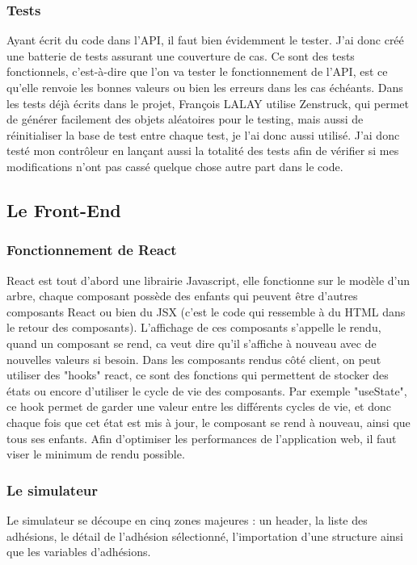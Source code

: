 \documentclass[a4paper,12pt]{report}
\begin{document}
\subsubsection{Tests}
Ayant écrit du code dans l'API, il faut bien évidemment le tester. J'ai donc créé une batterie de tests assurant une couverture de cas. Ce sont des tests fonctionnels, c'est-à-dire que l'on va tester le fonctionnement de l'API, est ce qu'elle renvoie les bonnes valeurs ou bien les erreurs dans les cas échéants. Dans les tests déjà écrits dans le projet, François LALAY utilise Zenstruck, qui permet de générer facilement des objets aléatoires pour le testing, mais aussi de réinitialiser la base de test entre chaque test, je l'ai donc aussi utilisé. J'ai donc testé mon contrôleur en lançant aussi la totalité des tests afin de vérifier si mes modifications n'ont pas cassé quelque chose autre part dans le code.

\subsection{Le Front-End}

\subsubsection{Fonctionnement de React}
React est tout d'abord une librairie Javascript, elle fonctionne sur le modèle d'un arbre, chaque composant possède des enfants qui peuvent être d'autres composants React ou bien du JSX (c'est le code qui ressemble à du HTML dans le retour des composants). L'affichage de ces composants s'appelle le rendu, quand un composant se rend, ca veut dire qu'il s'affiche à nouveau avec de nouvelles valeurs si besoin. Dans les composants rendus côté client, on peut utiliser des "hooks" react, ce sont des fonctions qui permettent de stocker des états ou encore d'utiliser le cycle de vie des composants. Par exemple "useState", ce hook permet de garder une valeur entre les différents cycles de vie, et donc chaque fois que cet état est mis à jour, le composant se rend à nouveau, ainsi que tous ses enfants. Afin d'optimiser les performances de l'application web, il faut viser le minimum de rendu possible.

\subsubsection{Le simulateur}

Le simulateur se découpe en cinq zones majeures : un header, la liste des adhésions, le détail de l'adhésion sélectionné, l'importation d'une structure ainsi que les variables d'adhésions.
\end{document}
